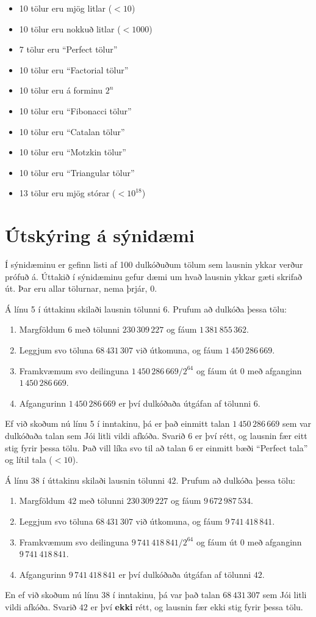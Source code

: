 \begin{itemize}
\item 10 tölur eru mjög litlar ($< 10$)
\item 10 tölur eru nokkuð litlar ($< 1000$)
\item 7 tölur eru ``Perfect tölur''
\item 10 tölur eru ``Factorial tölur''
\item 10 tölur eru á forminu $2^n$
\item 10 tölur eru ``Fibonacci tölur''
\item 10 tölur eru ``Catalan tölur''
\item 10 tölur eru ``Motzkin tölur''
\item 10 tölur eru ``Triangular tölur''
\item 13 tölur eru mjög stórar ($< 10^{18}$)
\end{itemize}

\section*{Útskýring á sýnidæmi}
Í sýnidæminu er gefinn listi af 100 dulkóðuðum tölum sem lausnin ykkar verður
prófuð á. Úttakið í sýnidæminu gefur dæmi um hvað lausnin ykkar gæti skrifað
út. Þar eru allar tölurnar, nema þrjár, $0$.

Á línu 5 í úttakinu skilaði lausnin tölunni $6$. Prufum að dulkóða þessa tölu:
\begin{enumerate}
    \item Margföldum $6$ með tölunni $230\,309\,227$ og fáum $1\,381\,855\,362$.
    \item Leggjum svo töluna $68\,431\,307$ við útkomuna, og fáum $1\,450\,286\,669$.
    \item Framkvæmum svo deilinguna $1\,450\,286\,669 / 2^{64}$ og fáum út $0$ með afganginn $1\,450\,286\,669$.
    \item Afgangurinn $1\,450\,286\,669$ er því dulkóðaða útgáfan af tölunni $6$.
\end{enumerate}
Ef við skoðum nú línu 5 í inntakinu, þá er það einmitt talan $1\,450\,286\,669$
sem var dulkóðaða talan sem Jói litli vildi afkóða. Svarið $6$ er því rétt, og
lausnin fær eitt stig fyrir þessa tölu. Það vill líka svo til að talan $6$ er
einmitt bæði ``Perfect tala'' og lítil tala ($< 10$).

Á línu 38 í úttakinu skilaði lausnin tölunni $42$. Prufum að dulkóða þessa tölu:
\begin{enumerate}
    \item Margföldum $42$ með tölunni $230\,309\,227$ og fáum $9\,672\,987\,534$.
    \item Leggjum svo töluna $68\,431\,307$ við útkomuna, og fáum $9\,741\,418\,841$.
    \item Framkvæmum svo deilinguna $9\,741\,418\,841 / 2^{64}$ og fáum út $0$ með afganginn $9\,741\,418\,841$.
    \item Afgangurinn $9\,741\,418\,841$ er því dulkóðaða útgáfan af tölunni $42$.
\end{enumerate}
En ef við skoðum nú línu 38 í inntakinu, þá var það talan $68\,431\,307$ sem
Jói litli vildi afkóða. Svarið $42$ er því \textbf{ekki} rétt, og lausnin fær
ekki stig fyrir þessa tölu.

